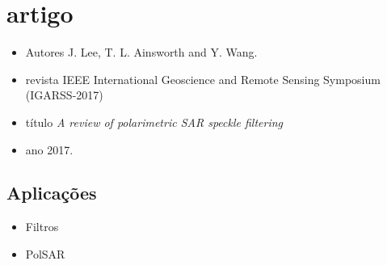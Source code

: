 \documentclass{article}
\begin{document}
\section{artigo \cite{law}}
\begin{itemize}
\item Autores J. Lee, T. L. Ainsworth and Y. Wang.
\item revista IEEE International Geoscience and Remote Sensing Symposium (IGARSS-2017)
\item título \textit{A review of polarimetric {SAR} speckle filtering}
\item ano 2017.
\end{itemize}
\subsection{Aplicações}
\begin{itemize}
\item Filtros
\item PolSAR
\end{itemize}
\end{document}
